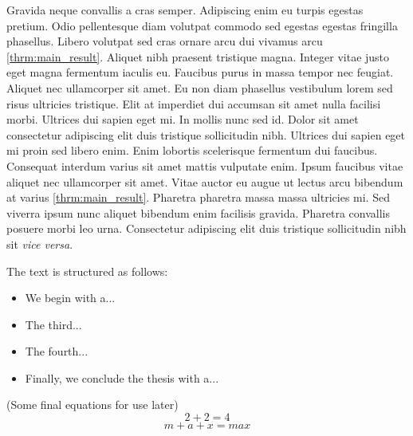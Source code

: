 \documentclass[../thesis.tex]{subfiles}
\begin{document}
Gravida neque convallis a cras semper. Adipiscing enim eu turpis egestas pretium. Odio pellentesque diam volutpat commodo sed egestas egestas fringilla phasellus. Libero volutpat sed cras ornare arcu dui vivamus arcu \cref{thrm:main_result}. Aliquet nibh praesent tristique magna. Integer vitae justo eget magna fermentum iaculis eu. Faucibus purus in massa tempor nec feugiat. Aliquet nec ullamcorper sit amet. Eu non diam phasellus vestibulum lorem sed risus ultricies tristique. Elit at imperdiet dui accumsan sit amet nulla facilisi morbi. Ultrices dui sapien eget mi. In mollis nunc sed id. Dolor sit amet consectetur adipiscing elit duis tristique sollicitudin nibh. Ultrices dui sapien eget mi proin sed libero enim. Enim lobortis scelerisque fermentum dui faucibus. Consequat interdum varius sit amet mattis vulputate enim. Ipsum faucibus vitae aliquet nec ullamcorper sit amet. Vitae auctor eu augue ut lectus arcu bibendum at varius \cref{thrm:main_result}. Pharetra pharetra massa massa ultricies mi. Sed viverra ipsum nunc aliquet bibendum enim facilisis gravida. Pharetra convallis posuere morbi leo urna. Consectetur adipiscing elit duis tristique sollicitudin nibh sit \emph{vice versa}.

The text is structured as follows:
\begin{itemize}
  \item We begin with a...
  \item The third...
  \item The fourth...
  \item Finally, we conclude the thesis with a...
\end{itemize}


(Some final equations for use later)
\begin{equation}\label{eq:five}
  2+2=4
\end{equation}
\begin{equation}\label{eq:six}
  m+a+x = max
\end{equation}
\end{document}
